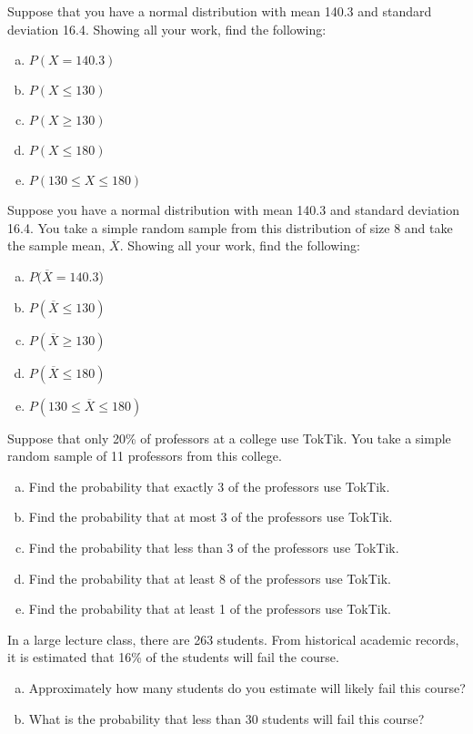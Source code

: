 \documentclass[12pt,letterpaper]{exam}
\begin{document}
\begin{questions}
\newpage
\question[10] Suppose that you have a normal distribution with mean 140.3 and standard deviation 16.4. Showing all your work, find the following:
	\begin{enumerate}[(a)]
	\item $P(X= 140.3)$
	\item $P(X \leq 130)$
	\item $P(X \geq 130)$
	\item $P(X \leq 180)$
	\item $P(130 \leq X \leq 180)$
	\end{enumerate}



\newpage
\question[10] Suppose you have a normal distribution with mean 140.3 and standard deviation 16.4. You take a simple random sample from this distribution of size 8 and take the sample mean, $\overline{X}$. Showing all your work, find the following:
	\begin{enumerate}[(a)]
	\item $P(\overline{X}= 140.3$)
	\item $P(\overline{X} \leq 130)$
	\item $P(\overline{X} \geq 130)$
	\item $P(\overline{X} \leq 180)$
	\item $P(130 \leq \overline{X} \leq 180)$
	\end{enumerate}



\newpage
\question[10] Suppose that only 20\% of professors at a college use TokTik. You take a simple random sample of 11 professors from this college.
	\begin{enumerate}[(a)]
	\item Find the probability that exactly 3 of the professors use TokTik.
	\item Find the probability that at most 3 of the professors use TokTik.
	\item Find the probability that less than 3 of the professors use TokTik.
	\item Find the probability that at least 8 of the professors use TokTik.
	\item Find the probability that at least 1 of the professors use TokTik.
	\end{enumerate}



\newpage
\question[10] In a large lecture class, there are 263 students. From historical academic records, it is estimated that 16\% of the students will fail the course. 
	\begin{enumerate}[(a)]
	\item Approximately how many students do you estimate will likely fail this course?
	\item What is the probability that less than 30 students will fail this course?
	\end{enumerate}




\end{questions}
\end{document}
